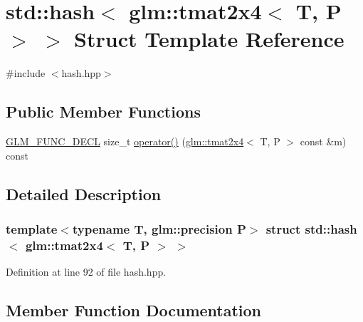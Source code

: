 \hypertarget{structstd_1_1hash_3_01glm_1_1tmat2x4_3_01_t_00_01_p_01_4_01_4}{}\section{std\+::hash$<$ glm\+::tmat2x4$<$ T, P $>$ $>$ Struct Template Reference}
\label{structstd_1_1hash_3_01glm_1_1tmat2x4_3_01_t_00_01_p_01_4_01_4}


{\ttfamily \#include $<$hash.\+hpp$>$}

\subsection*{Public Member Functions}
\begin{DoxyCompactItemize}
\item 
\mbox{\hyperlink{setup_8hpp_ab2d052de21a70539923e9bcbf6e83a51}{G\+L\+M\+\_\+\+F\+U\+N\+C\+\_\+\+D\+E\+CL}} size\+\_\+t \mbox{\hyperlink{structstd_1_1hash_3_01glm_1_1tmat2x4_3_01_t_00_01_p_01_4_01_4_aa9d442a5d95414c0924492f564fad11a}{operator()}} (\mbox{\hyperlink{structglm_1_1tmat2x4}{glm\+::tmat2x4}}$<$ T, P $>$ const \&m) const
\end{DoxyCompactItemize}


\subsection{Detailed Description}
\subsubsection*{template$<$typename T, glm\+::precision P$>$\newline
struct std\+::hash$<$ glm\+::tmat2x4$<$ T, P $>$ $>$}



Definition at line 92 of file hash.\+hpp.



\subsection{Member Function Documentation}
\mbox{\label{structstd_1_1hash_3_01glm_1_1tmat2x4_3_01_t_00_01_p_01_4_01_4_aa9d442a5d95414c0924492f564fad11a}} 
